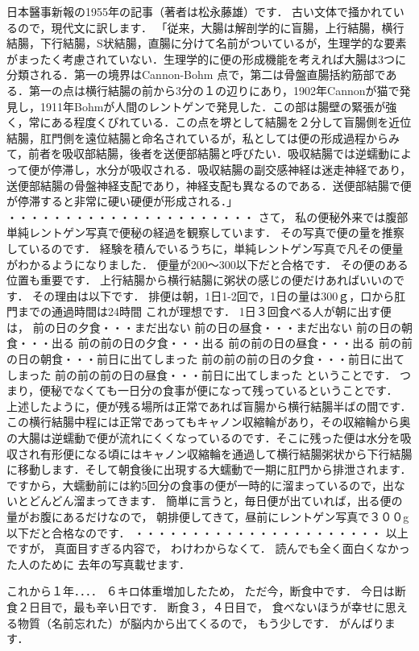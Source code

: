 日本醫事新報の1955年の記事（著者は松永藤雄）です．
古い文体で掻かれているので，現代文に訳します．
「従来，大腸は解剖学的に盲腸，上行結腸，横行結腸，下行結腸，S状結腸，直腸に分けて名前がついているが，生理学的な要素がまったく考慮されていない．生理学的に便の形成機能を考えれば大腸は3つに分類される．第一の境界はCannon-Bohm
点で，第二は骨盤直腸括約筋部である．第一の点は横行結腸の前から3分の１の辺りにあり，1902年Cannonが猫で発見し，1911年Bohmが人間のレントゲンで発見した．この部は腸壁の緊張が強く，常にある程度くびれている．この点を堺として結腸を２分して盲腸側を近位結腸，肛門側を遠位結腸と命名されているが，私としては便の形成過程からみて，前者を吸収部結腸，後者を送便部結腸と呼びたい．吸収結腸では逆蠕動によって便が停滞し，水分が吸収される．吸収結腸の副交感神経は迷走神経であり，送便部結腸の骨盤神経支配であり，神経支配も異なるのである．送便部結腸で便が停滞すると非常に硬い硬便が形成される．」
・・・・・・・・・・・・・・・・・・・・・・
さて，
私の便秘外来では腹部単純レントゲン写真で便秘の経過を観察しています．
その写真で便の量を推察しているのです．
経験を積んでいるうちに，単純レントゲン写真で凡その便量がわかるようになりました．
便量が200～300以下だと合格です．
その便のある位置も重要です．
上行結腸から横行結腸に粥状の感じの便だけあればいいのです．
その理由は以下です．
排便は朝，1日1-2回で，1日の量は300ｇ，口から肛門までの通過時間は24時間
これが理想です．
1日３回食べる人が朝に出す便は，
前の日の夕食・・・まだ出ない
前の日の昼食・・・まだ出ない
前の日の朝食・・・出る
前の前の日の夕食・・・出る
前の前の日の昼食・・・出る
前の前の日の朝食・・・前日に出てしまった
前の前の前の日の夕食・・・前日に出てしまった
前の前の前の日の昼食・・・前日に出てしまった
ということです．
つまり，便秘でなくても一日分の食事が便になって残っているということです．
上述したように，便が残る場所は正常であれば盲腸から横行結腸半ばの間です．
この横行結腸中程には正常であってもキャノン収縮輪があり，その収縮輪から奥の大腸は逆蠕動で便が流れにくくなっているのです．そこに残った便は水分を吸収され有形便になる頃にはキャノン収縮輪を通過して横行結腸粥状から下行結腸に移動します．そして朝食後に出現する大蠕動で一期に肛門から排泄されます．ですから，大蠕動前には約5回分の食事の便が一時的に溜まっているので，出ないとどんどん溜まってきます．
簡単に言うと，毎日便が出ていれば，出る便の量がお腹にあるだけなので，
朝排便してきて，昼前にレントゲン写真で３００g以下だと合格なのです．
・・・・・・・・・・・・・・・・・・・・・・
以上ですが，
真面目すぎる内容で，
わけわからなくて．
読んでも全く面白くなかった人のために
去年の写真載せます．

これから１年．．．．
６キロ体重増加したため，
ただ今，断食中です．
今日は断食２日目で，最も辛い日です．
断食３，４日目で，
食べないほうが幸せに思える物質（名前忘れた）が脳内から出てくるので，
もう少しです．
がんばります．

